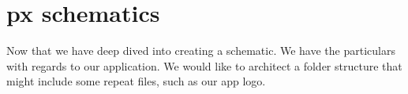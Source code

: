 \maketitle{}
\section{px schematics}

Now that we have deep dived into creating a schematic. We have the particulars
with regards to our application. We would like to architect a folder structure
that might include some repeat files, such as our app logo.

